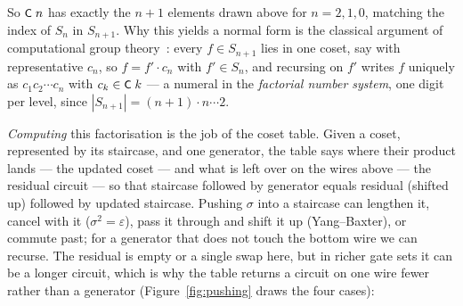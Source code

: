 \noindent So $\mbox{\textsf{\small C}}\;n$ has exactly the $n{+}1$ elements drawn above
for $n = 2, 1, 0$, matching the index of $S_n$ in $S_{n+1}$.  Why this yields
a normal form is the classical argument of computational group
theory~\cite{sims1994computation,holt2005handbook}:
every $f \in S_{n+1}$ lies in one coset, say with representative $c_n$,
so $f = f' \cdot c_n$ with $f' \in S_n$, and recursing on $f'$ writes $f$
uniquely as $c_1 c_2 \cdots c_n$ with $c_k \in \mbox{\textsf{\small C}}\;k$ --- a numeral
in the \emph{factorial number system}, one digit per level, since
$|S_{n+1}| = (n{+}1) \cdot n \cdots 2$.

\emph{Computing} this factorisation is the job of the coset table.
Given a coset, represented by its staircase, and one generator, the
table says where their product lands --- the updated coset --- and what
is left over on the wires above --- the residual circuit --- so that
staircase followed by generator equals residual (shifted up) followed by
updated staircase.
Pushing $\sigma$ into a staircase can lengthen it, cancel with it ($\sigma^2 =
\varepsilon$), pass it through and shift it up (Yang--Baxter), or
commute past; for a generator that does not touch the bottom wire we can
recurse.  The residual is empty or a single swap here, but in richer
gate sets it can be a longer circuit, which is why the table returns a
circuit on one wire fewer rather than a generator
(Figure~\ref{fig:pushing} draws the four cases):

